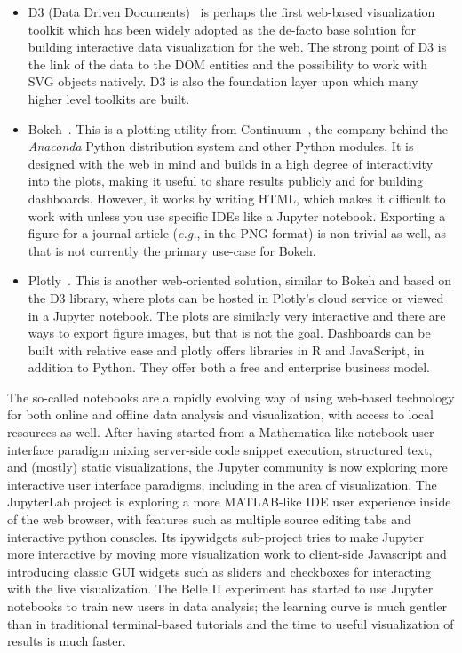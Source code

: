 \documentclass[12pt,a4paper]{article}
\begin{document}
\begin{itemize}
\item D3 (Data Driven Documents)~\cite{D32011} is perhaps the first web-based visualization toolkit which has been widely
adopted as the de-facto base solution for building interactive data visualization for the web. The strong point of D3 is the
link of the data to the DOM entities and the possibility to work with SVG objects natively. D3 is also the foundation layer
upon which many higher level toolkits are built.

\item Bokeh~\cite{Bokeh2014}. This is a plotting utility from Continuum~\cite{continuum}, the company behind the
\textit{Anaconda} Python distribution system and other Python modules. It is designed with the web in mind and builds in a high degree of
interactivity into the plots, making it useful to share results publicly and for building dashboards. However, it works by
writing HTML, which makes it difficult to work with unless you use specific IDEs like a Jupyter notebook. Exporting a figure
for a journal article ({\it e.g.}, in the PNG format) is non-trivial as well, as that is not currently the primary use-case for Bokeh.

\item Plotly~\cite{Plotly2015}. This is another web-oriented solution, similar to Bokeh and based on the D3 library, where plots
can be hosted in Plotly’s cloud service or viewed in a Jupyter notebook. The plots are similarly very interactive and there
are ways to export figure images, but that is not the goal. Dashboards can be built with relative ease and plotly offers
libraries in R and JavaScript, in addition to Python. They offer both a free and enterprise business model.
\end{itemize}

The so-called notebooks are a rapidly evolving way of using web-based technology for both online and offline data analysis and
visualization, with access to local resources as well. After having started from a Mathematica-like notebook user interface
paradigm mixing server-side code snippet execution, structured text, and (mostly) static visualizations, the Jupyter community
is now exploring more interactive user interface paradigms, including in the area of visualization. The JupyterLab project is
exploring a more MATLAB-like IDE user experience inside of the web browser, with features such as multiple source editing tabs
and interactive python consoles. Its ipywidgets sub-project tries to make Jupyter more interactive by moving more visualization
work to client-side Javascript and introducing classic GUI widgets such as sliders and checkboxes for interacting with the live visualization.
The Belle II experiment has started to use Jupyter notebooks to train new users in data analysis; the learning curve is much gentler than in
traditional terminal-based tutorials and the time to useful visualization of results is much faster.
\end{document}
